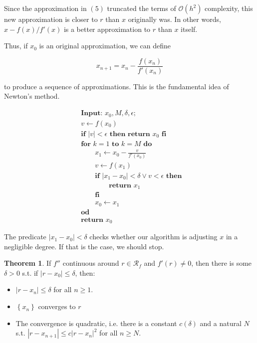 \documentclass[12pt]{article}
\theoremstyle{definition}
\newtheorem{theorem}{Theorem}
\begin{document}
Since the approximation in $(5)$ truncated the terms of $\mathcal{O}(h^2)$
complexity, this new approximation is closer to $r$ than $x$ originally was. In
other words, $x - f(x) / f'(x)$ is a better approximation to $r$ than $x$
itself. 

Thus, if $x_0$ is an original approximation, we can define 

\begin{equation}
    x_{n+1} = x_n - \frac{f(x_n)}{f'(x_n)}
\end{equation}

to produce a sequence of approximations. This is the fundamental idea of
Newton's method.

\begin{align*}
&\textbf{Input: } x_0, M, \delta, \epsilon; \\ 
&v \leftarrow f(x_0) \\ 
&\textbf{if } |v| < \epsilon \textbf{ then return }  x_0 \textbf{ fi }\\ 
&\textbf{for } k = 1 \textbf{ to } k = M \textbf{ do } \\ 
&\qquad x_1 \leftarrow x_0 - \frac{v}{f'(x_0)} \\
&\qquad v \leftarrow f(x_1) \\ 
&\qquad \textbf{if } \left| x_1 - x_0 \right| < \delta \lor v < \epsilon
\textbf{ then } \\ 
&\qquad\qquad \textbf{return } x_1 \\ 
&\qquad\textbf{fi} \\ 
&\qquad x_0 \leftarrow x_1 \\ 
&\textbf{od} \\ 
&\textbf{return } x_0
\end{align*}

The predicate $\left| x_1 - x_0 \right| < \delta$ checks whether our algorithm
is adjusting $x$ in a negligible degree. If that is the case, we
should stop. 

\begin{theorem}
    If $f''$ continuous around $r \in \mathcal{R}_f$ and $f'(r) \neq 0$, then
    there is some $\delta > 0$ s.t. if $\left| r - x_0 \right| \leq \delta $,
    then: 

    \begin{itemize}
        \item $\left| r - x_n \right| \leq \delta $ for all $n \geq 1$. 
        \item $\left\{ x_n \right\} $ converges to $r$  
        \item The convergence is quadratic, i.e. there is a constant $c(\delta)$
            and a natural $N$ s.t. $\left| r - x_{n+1} \right| \leq c\left| r -
            x_n\right|^2  $ for all $n \geq N$.
    \end{itemize}

\end{theorem}
\end{document}
